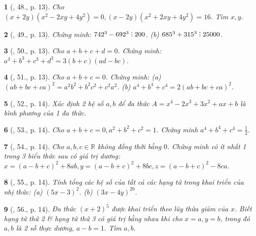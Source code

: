 \documentclass{article}
\newtheorem{baitoan}{}
\DeclareRobustCommand{\divby}{%
	\mathrel{\vbox{\baselineskip.65ex\lineskiplimit0pt\hbox{.}\hbox{.}\hbox{.}}}%
}
\begin{document}
\begin{baitoan}[\cite{Tuyen_Toan_8}, 48., p. 13]
	Cho $(x + 2y)(x^2 - 2xy + 4y^2) = 0,(x - 2y)(x^2 + 2xy + 4y^2) = 16$. Tìm $x,y$.
\end{baitoan}

\begin{baitoan}[\cite{Tuyen_Toan_8}, 49., p. 13]
	Chứng minh: $742^3 - 692^3\divby200$. (b) $685^3 + 315^3\divby25000$.
\end{baitoan}

\begin{baitoan}[\cite{Tuyen_Toan_8}, 50., p. 13]
	Cho $a + b + c + d = 0$. Chứng minh: $a^3 + b^3 + c^3 + d^3 = 3(b + c)(ad - bc)$.
\end{baitoan}

\begin{baitoan}[\cite{Tuyen_Toan_8}, 51., p. 13]
	Cho $a + b + c = 0$. Chứng minh: (a) $(ab + bc + ca)^2 = a^2b^2 + b^2c^2 + c^2a^2$. (b) $a^4 + b^4 + c^4 = 2(ab + bc + ca)^2$.
\end{baitoan}

\begin{baitoan}[\cite{Tuyen_Toan_8}, 52., p. 14]
	Xác định 2 hệ số $a,b$ để đa thức $A = x^4 - 2x^3 + 3x^2 + ax + b$ là bình phương của 1 đa thức.
\end{baitoan}

\begin{baitoan}[\cite{Tuyen_Toan_8}, 53., p. 14]
	Cho $a + b + c = 0,a^2 + b^2 + c^2 = 1$. Chứng minh $a^4 + b^4 + c^4 = \frac{1}{2}$.
\end{baitoan}

\begin{baitoan}[\cite{Tuyen_Toan_8}, 54., p. 14]
	Cho $a,b,c\in\mathbb{R}$ không đồng thời bằng $0$. Chứng minh có ít nhất 1 trong 3 biểu thức sau có giá trị dương: $x = (a - b + c)^2 + 8ab,y = (a - b + c)^2 + 8bc,z = (a - b + c)^2 - 8ca$.
\end{baitoan}

\begin{baitoan}[\cite{Tuyen_Toan_8}, 55., p. 14]
	Tính tổng các hệ số của tất cả các hạng tử trong khai triển của nhị thức: (a) $(5x - 3)^2$. (b) $(3x - 4y)^{20}$.
\end{baitoan}

\begin{baitoan}[\cite{Tuyen_Toan_8}, 56., p. 14]
	Đa thức $(x + 2)^5$ được khai triển theo lũy thừa giảm của $x$. Biết hạng tử thứ 2 \& hạng tử thứ 3 có giá trị bằng nhau khi cho $x = a,y = b$, trong đó $a,b$ là 2 số thực dương, $a - b = 1$. Tìm $a,b$.
\end{baitoan}
\end{document}
